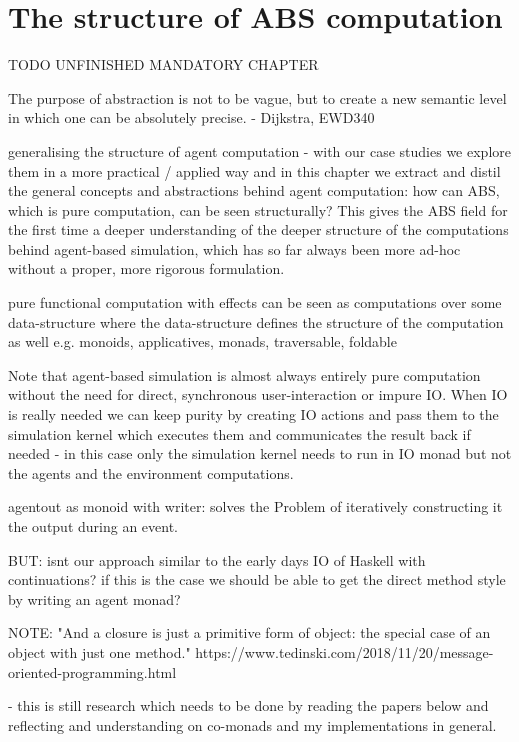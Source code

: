\chapter{The structure of ABS computation}
\label{ch:structure_abs_computation}

TODO UNFINISHED MANDATORY CHAPTER

The purpose of abstraction is not to be vague, but to create a new semantic level in which one can be absolutely precise. - Dijkstra, EWD340

generalising the structure of agent computation - with our case studies we explore them in a more practical / applied way and in this chapter we extract and distil the general concepts and abstractions behind agent computation: how can ABS, which is pure computation, can be seen structurally? This gives the ABS field for the first time a deeper understanding of the deeper structure of the computations behind agent-based simulation, which has so far always been more ad-hoc without a proper, more rigorous formulation. 

pure functional computation with effects can be seen as computations over some data-structure where the data-structure defines the structure of the computation as well e.g. monoids, applicatives, monads, traversable, foldable

Note that agent-based simulation is almost always entirely pure computation without the need for direct, synchronous user-interaction or impure IO. When IO is really needed we can keep purity by creating IO actions and pass them to the simulation kernel which executes them and communicates the result back if needed - in this case only the simulation kernel needs to run in IO monad but not the agents and the environment computations.

agentout as monoid with writer: solves the Problem of iteratively constructing it the output during an event.

BUT: isnt our approach similar to the early days IO of Haskell with continuations? if this is the case we should be able to get the direct method style by writing an agent monad?

NOTE: "And a closure is just a primitive form of object: the special case of an object with just one method." https://www.tedinski.com/2018/11/20/message-oriented-programming.html

- this is still research which needs to be done by reading the papers below and reflecting  and understanding on co-monads and my implementations in general.

